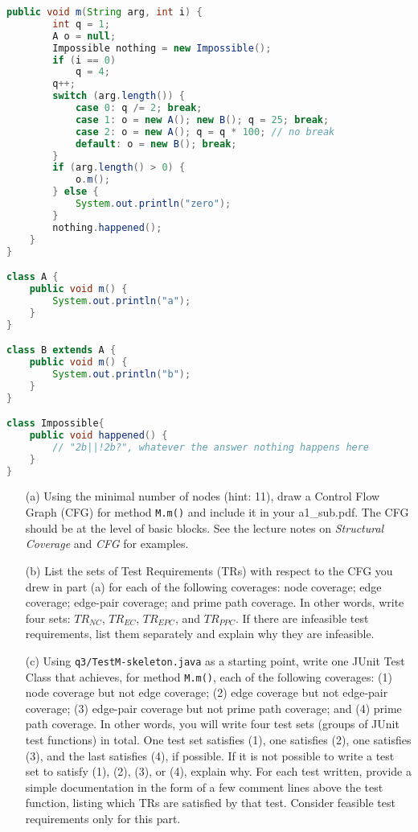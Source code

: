\documentclass[10pt]{article}
\begin{document}
{{\begin{lstlisting}[language=Java]
	public void m(String arg, int i) {
		int q = 1;
		A o = null;
		Impossible nothing = new Impossible();
		if (i == 0)
			q = 4;
		q++;
		switch (arg.length()) {
			case 0: q /= 2; break;
			case 1: o = new A(); new B(); q = 25; break;
			case 2: o = new A(); q = q * 100; // no break
			default: o = new B(); break;
		}
		if (arg.length() > 0) {
			o.m();
		} else {
			System.out.println("zero");
		}
		nothing.happened();
	}
}

class A {
	public void m() { 
		System.out.println("a");
	}
}

class B extends A {
	public void m() { 
		System.out.println("b");
	}
}

class Impossible{
	public void happened() {
		// "2b||!2b?", whatever the answer nothing happens here
	}
}
\end{lstlisting}
}

\begin{itemize}
\item
[(a)] Using the minimal number of nodes (hint: 11), draw a Control Flow Graph (CFG) for method {\tt M.m()} and include it in your a1\_sub.pdf. The CFG should be at the level of basic blocks. 
See the lecture notes on {\em Structural Coverage} and {\em CFG} for examples.

\item
[(b)] List the sets of Test Requirements (TRs) with respect to the CFG you drew in part (a) for each of the following coverages: node coverage; edge coverage; edge-pair coverage; and prime path coverage. In other words, write 
four sets: $\mathit{TR}_{\mathit{NC}}$,  $\mathit{TR}_{\mathit{EC}}$, $\mathit{TR}_{\mathit{EPC}}$, and $\mathit{TR}_{\mathit{PPC}}$. If there are infeasible test requirements, list them separately and explain why they are infeasible.

\item
[(c)] Using {\tt q3/TestM-skeleton.java} as a starting point, write one JUnit Test Class that achieves, for method {\tt M.m()}, each of the following coverages: (1) node coverage but not edge coverage; (2) edge coverage but not edge-pair coverage; (3) edge-pair coverage but not prime path coverage; and (4) prime path coverage.  In other words, you will write four test sets (groups of JUnit test functions) in total. One test set satisfies (1), one satisfies (2), one satisfies (3), and the last satisfies (4), if possible. If it is not possible to write a test set to satisfy (1), (2), (3), or (4), explain why. For each test written, provide a simple documentation in the form of a few comment lines above the test function, listing which TRs are satisfied by that test. Consider feasible test requirements only for this part. 
\end{itemize}

}
\end{document}
